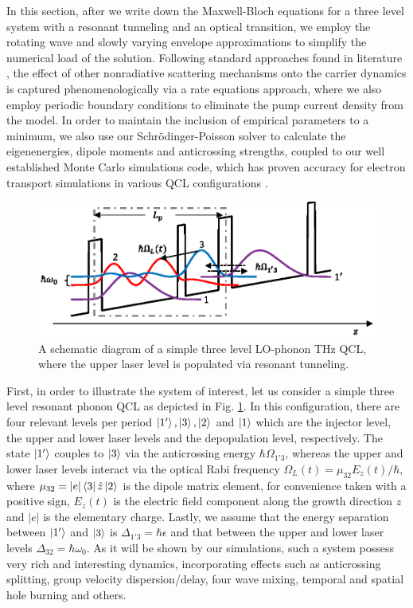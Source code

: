 \documentclass[10pt,letterpaper]{article}
\begin{document}
In this section, after we write down the Maxwell-Bloch equations for a three level system with a resonant tunneling and an optical transition, we employ the rotating wave and slowly varying envelope approximations to simplify the numerical load of the solution. Following standard approaches found in literature \cite{wang2015active,callebaut2005importance}, the effect of other nonradiative scattering mechanisms onto the carrier dynamics is captured phenomenologically via a  rate equations approach, where we also employ periodic boundary conditions to eliminate the pump current density from the model. In order to maintain the inclusion of empirical parameters to a minimum, we also use our Schr{\"o}dinger-Poisson solver to calculate the eigenenergies, dipole moments and anticrossing strengths, coupled to our well established Monte Carlo simulations code, which has proven accuracy for electron transport simulations in various QCL configurations \cite{jirauschek2007comparative,jirauschek2009monte,jirauschek2010monte}.
\begin{figure}[h!]
	\centering
	\includegraphics[scale=0.7]{figs/TOYMODEL.eps}
	\caption{A schematic diagram of a simple three level LO-phonon THz QCL, where the upper laser level is populated via resonant tunneling.} \label{fig:img01}
\end{figure}

First, in order to illustrate the system of interest, let us consider a simple three level resonant phonon QCL as depicted in Fig. \ref{fig:img01}. In this configuration, there are four relevant levels per period $\Ket{1'}, \Ket{3}, \Ket{2} $ and $\Ket{1}$ which are the injector level, the upper and lower laser levels and the depopulation level, respectively. The state $\Ket{1'}$ couples to $\Ket{3}$ via the anticrossing energy $\hbar\Omega_{1'3}$, whereas the upper and lower laser levels interact via the optical Rabi frequency $\Omega_L(t)= \mu_{32}E_z(t)/\hbar$, where $\mu_{32} = |e| \Bra{3}\hat{z} \Ket{2}$ is the dipole matrix element, for convenience taken with a positive sign, $E_z(t)$ is the electric field component along the growth direction $z$ and $|e|$ is the elementary charge. Lastly, we assume that the energy separation between $\Ket{1'}$ and $\Ket{3}$ is $\Delta_{1'3} = \hbar \epsilon$ and that between the upper and lower laser levels $\Delta_{32} = \hbar \omega_0$. As it will be shown by our simulations, such a system possess very rich and interesting dynamics, incorporating effects such as anticrossing splitting, group velocity dispersion/delay, four wave mixing, temporal and spatial hole burning and others.
\end{document}
